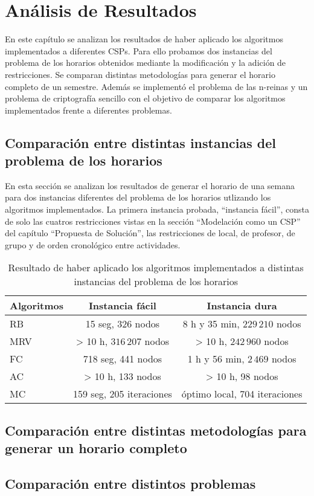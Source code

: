 \chapter{An\'alisis de Resultados}

En este cap\'itulo se analizan los resultados de haber aplicado los algoritmos implementados a diferentes CSPs. Para ello probamos dos instancias del problema de los horarios obtenidos mediante la modificaci\'on y la adici\'on de restricciones. Se comparan distintas metodolog\'ias para generar el horario completo de un semestre. Adem\'as se implement\'o el problema de las n-reinas y un problema de criptograf\'ia sencillo con el objetivo de comparar los algoritmos implementados frente a diferentes problemas.

\section{Comparaci\'on entre distintas instancias del problema de los horarios}

En esta secci\'on se analizan los resultados de generar el horario de una semana para dos instancias diferentes del problema de los horarios utlizando los algoritmos implementados. La primera instancia probada, ``instancia f\'acil'', consta de solo las cuatros restricciones vistas en la secci\'on ``Modelaci\'on como un CSP'' del cap\'itulo ``Propuesta de Solución'', las restricciones de local, de profesor, de grupo y de orden cronol\'ogico entre actividades.

\begin{table}[h]
	\caption{Resultado de haber aplicado los algoritmos implementados a distintas instancias del problema de los horarios}
	\begin{center}
		\label{1semana}
		\begin{tabular}{l|c|c}
			Algoritmos & Instancia f\'acil & Instancia dura \\ \hline
			RB & 15 seg, 326 nodos & 8 h y 35 min, $229\,210$ nodos\\
			MRV & > 10 h, $316\,207$ nodos &  > 10 h, $242\,960$ nodos\\
			FC & 718 seg, 441 nodos & 1 h y 56 min, $2\,469$ nodos \\
			AC & > 10 h, 133 nodos &  > 10 h, 98 nodos \\
			MC & 159 seg, 205 iteraciones & \'optimo local, 704 iteraciones
		\end{tabular}
	\end{center}
\end{table}

\section{Comparaci\'on entre distintas metodolog\'ias para generar un horario completo}

\section{Comparaci\'on entre distintos problemas}